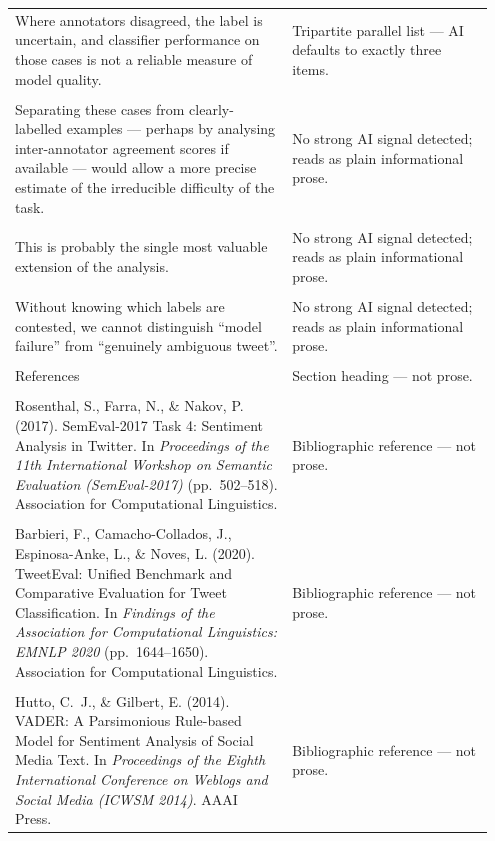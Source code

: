 \documentclass[11pt]{article}
\begin{document}
\begin{longtable}{|p{0.55\linewidth}|p{0.40\linewidth}|}
\hline
\rule{0pt}{3.5cm} & \\
\hline
Where annotators disagreed, the label is uncertain, and classifier performance on those cases is not a reliable measure of model quality. & Tripartite parallel list --- AI defaults to exactly three items. \\[2pt]
\hline
\rule{0pt}{3.5cm} & \\
\hline
Separating these cases from clearly-labelled examples --- perhaps by analysing inter-annotator agreement scores if available --- would allow a more precise estimate of the irreducible difficulty of the task. & No strong AI signal detected; reads as plain informational prose. \\[2pt]
\hline
\rule{0pt}{3.5cm} & \\
\hline
This is probably the single most valuable extension of the analysis. & No strong AI signal detected; reads as plain informational prose. \\[2pt]
\hline
\rule{0pt}{3.5cm} & \\
\hline
Without knowing which labels are contested, we cannot distinguish ``model failure'' from ``genuinely ambiguous tweet''. & No strong AI signal detected; reads as plain informational prose. \\[2pt]
\hline
\rule{0pt}{3.5cm} & \\
\hline
References & Section heading --- not prose. \\[2pt]
\hline
\rule{0pt}{3.5cm} & \\
\hline
Rosenthal, S., Farra, N., \& Nakov, P. (2017). SemEval-2017 Task 4: Sentiment Analysis in Twitter. In \textit{Proceedings of the 11th International Workshop on Semantic Evaluation (SemEval-2017)} (pp.\ 502--518). Association for Computational Linguistics. & Bibliographic reference --- not prose. \\[2pt]
\hline
\rule{0pt}{3.5cm} & \\
\hline
Barbieri, F., Camacho-Collados, J., Espinosa-Anke, L., \& Noves, L. (2020). TweetEval: Unified Benchmark and Comparative Evaluation for Tweet Classification. In \textit{Findings of the Association for Computational Linguistics: EMNLP 2020} (pp.\ 1644--1650). Association for Computational Linguistics. & Bibliographic reference --- not prose. \\[2pt]
\hline
\rule{0pt}{3.5cm} & \\
\hline
Hutto, C.~J., \& Gilbert, E. (2014). VADER: A Parsimonious Rule-based Model for Sentiment Analysis of Social Media Text. In \textit{Proceedings of the Eighth International Conference on Weblogs and Social Media (ICWSM 2014)}. AAAI Press. & Bibliographic reference --- not prose. \\[2pt]

\end{longtable}
\end{document}
